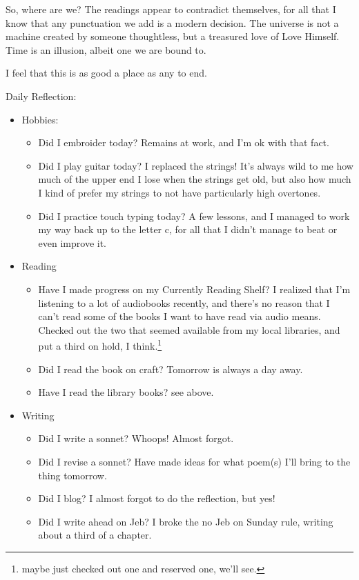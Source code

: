 \documentclass[12pt]{article}[titlepage]
\newcommand{\1}{\={a}}
\newcommand{\2}{\={e}}
\newcommand{\3}{\={\i}}
\newcommand{\4}{\=o}
\newcommand{\5}{\=u}
\newcommand{\6}{\={A}}
\renewcommand{\,}{\textsuperscript{,}}
\begin{document}
So, where are we?
The readings appear to contradict themselves, for all that I know that any punctuation we add is a modern decision.
The universe is not a machine created by someone thoughtless, but a treasured love of Love Himself.
Time is an illusion, albeit one we are bound to.

I feel that this is as good a place as any to end.

Daily Reflection:
\begin{itemize}
\item Hobbies:
\begin{itemize}
\item Did I embroider today? Remains at work, and I'm ok with that fact.
\item Did I play guitar today? I replaced the strings! It's always wild to me how much of the upper end I lose when the strings get old, but also how much I kind of prefer my strings to not have particularly high overtones.
\item Did I practice touch typing today? A few lessons, and I managed to work my way back up to the letter c, for all that I didn't manage to beat or even improve it.
\end{itemize}
\item Reading
\begin{itemize}
\item Have I made progress on my Currently Reading Shelf? I realized that I'm listening to a lot of audiobooks recently, and there's no reason that I can't read some of the books I want to have read via audio means. Checked out the two that seemed available from my local libraries, and put a third on hold, I think.\footnote{maybe just checked out one and reserved one, we'll see.}
\item Did I read the book on craft? Tomorrow is always a day away.
\item Have I read the library books? see above.
\end{itemize}
\item Writing
\begin{itemize}
\item Did I write a sonnet? Whoops! Almost forgot.
\item Did I revise a sonnet? Have made ideas for what poem(s) I'll bring to the thing tomorrow.
\item Did I blog? I almost forgot to do the reflection, but yes!
\item Did I write ahead on Jeb? I broke the no Jeb on Sunday rule, writing about a third of a chapter.

\end{itemize}
\end{itemize}
\end{document}
